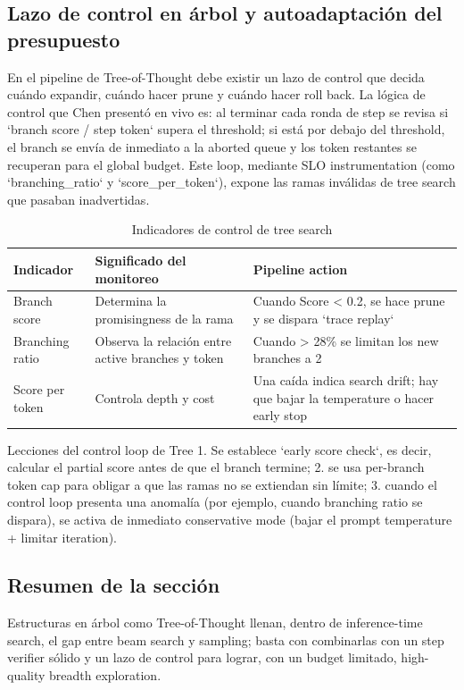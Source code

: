 \subsection{Lazo de control en árbol y autoadaptación del presupuesto}
En el pipeline de Tree-of-Thought debe existir un lazo de control que decida cuándo expandir, cuándo hacer prune y cuándo hacer roll back. La lógica de control que Chen presentó en vivo es: al terminar cada ronda de step se revisa si `branch score / step token` supera el threshold; si está por debajo del threshold, el branch se envía de inmediato a la aborted queue y los token restantes se recuperan para el global budget. Este loop, mediante SLO instrumentation (como `branching\_ratio` y `score\_per\_token`), expone las ramas inválidas de tree search que pasaban inadvertidas.

\begin{table}[H]
\centering
\caption{Indicadores de control de tree search}
\begin{tabular}{p{}p{}p{}}
\toprule
Indicador & Significado del monitoreo & Pipeline action \\
\midrule
Branch score & Determina la promisingness de la rama & Cuando Score < 0.2, se hace prune y se dispara `trace replay` \\
Branching ratio & Observa la relación entre active branches y token & Cuando > 28\% se limitan los new branches a 2 \\
Score per token & Controla depth y cost & Una caída indica search drift; hay que bajar la temperature o hacer early stop \\
\bottomrule
\end{tabular}
\end{table}

\begin{importantbox}{Lecciones del control loop de Tree}
1. Se establece `early score check`, es decir, calcular el partial score antes de que el branch termine; 2. se usa per-branch token cap para obligar a que las ramas no se extiendan sin límite; 3. cuando el control loop presenta una anomalía (por ejemplo, cuando branching ratio se dispara), se activa de inmediato conservative mode (bajar el prompt temperature + limitar iteration).
\end{importantbox}

\subsection{Resumen de la sección}
Estructuras en árbol como Tree-of-Thought llenan, dentro de inference-time search, el gap entre beam search y sampling; basta con combinarlas con un step verifier sólido y un lazo de control para lograr, con un budget limitado, high-quality breadth exploration.
